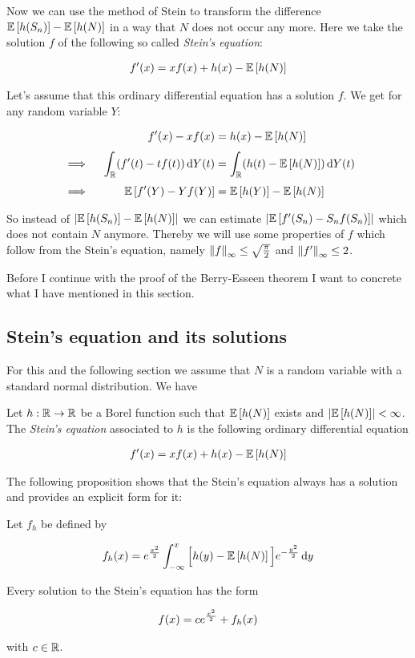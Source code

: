 Now we can use the method of Stein to transform the difference $\mathbb E\left[{h(S_n)}\right]-\mathbb E\left[{h(N)}\right]$ in a way that $N$ does not occur any more. Here we take the solution $f$ of the following so called \emph{Stein's equation}:

\begin{align}
  f'(x)=xf(x) + h(x) - \mathbb E\left[{h(N)}\right]
\end{align}

Let's assume that this ordinary differential equation has a solution $f$. We get for any random variable $Y$:

\begin{align}
  &            & f'(x) - xf(x) & = h(x) - \E{h(N)} \nl
  &  \implies\ & \int_{\R} (f'(t)-t f(t)) \d{Y}(t) &= \int_{\R} (h(t)-\E{h(N)}) \d{Y}(t) \nl 
  &  \implies\ & \E{f'(Y)-Y f(Y)} &= \E{h(Y)}-\E{h(N)}
\end{align}

So instead of $\left|{\mathbb E\left[{h(S_n)}\right]-\mathbb E\left[{h(N)}\right]}\right|$ we can estimate $\left|{\mathbb E\left[{f'(S_n)-S_n f(S_n)}\right]}\right|$ which does not contain $N$ anymore. Thereby we will use some properties of $f$ which follow from the Stein's equation, namely $\left\|{f}\right\|_\infty \le \sqrt{\tfrac \pi2}$ and $\left\|{f'}\right\|_\infty \le 2$.

Before I continue with the proof of the Berry-Esseen theorem I want to concrete what I have mentioned in this section.

\subsection{Stein's equation and its solutions}

For this and the following section we assume that $N$ is a random variable with a standard normal distribution. We have

\begin{definition}
  Let $h:\mathbb R \to \mathbb R$ be a Borel function such that $\mathbb E\left[{h(N)}\right]$ exists and $\left|{\mathbb E\left[{h(N)}\right]}\right| < \infty$. The \emph{Stein's equation} associated to $h$ is the following ordinary differential equation

  \begin{align}
    f'(x) = x f(x) + h(x) - \mathbb E\left[{h(N)}\right]
  \end{align}
\end{definition}

The following proposition shows that the Stein's equation always has a solution and provides an explicit form for it:

\begin{proposition}
  Let $f_h$ be defined by

  \begin{align}
    f_h(x) = e^{\frac{x^2}{2}} \int_{-\infty}^x \Big[h(y)-\mathbb E\left[{h(N)}\right]\Big] e^{-\frac{y^2}{2}}\,\mathrm d{y}
  \end{align}

  \noindent Every solution to the Stein's equation has the form

  \begin{align}
    f(x) = c e^{\frac{x^2}{2}} + f_h(x)
  \end{align}

  \noindent with $c \in \mathbb R$.
\end{proposition}

